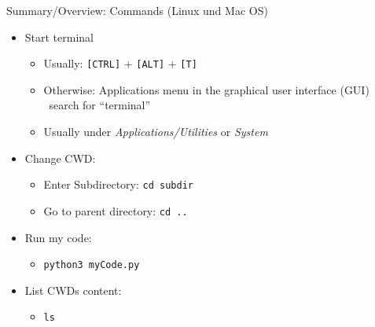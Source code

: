 
\begin{frame}{Summary/Overview: Commands (Linux und Mac OS)}
\begin{itemize}
\item Start terminal
	\begin{itemize}
	\item Usually: \texttt{[CTRL]} + \texttt{[ALT]} + \texttt{[T]}
	\item Otherwise: Applications menu in the graphical user interface (GUI) \thus ~search for \enquote{terminal}
	\item Usually under \emph{Applications/Utilities} or \emph{System}
	\end{itemize}
\item Change CWD:
	\begin{itemize}
	\item Enter Subdirectory: \texttt{cd subdir}
	\item Go to parent directory: \texttt{cd ..}
	\end{itemize}
\item Run my code:
	\begin{itemize}
	\item \texttt{python3 myCode.py}
	\end{itemize}
\item List CWDs content:
	\begin{itemize}
	\item \texttt{ls}
	\end{itemize}
\end{itemize}
\end{frame}



